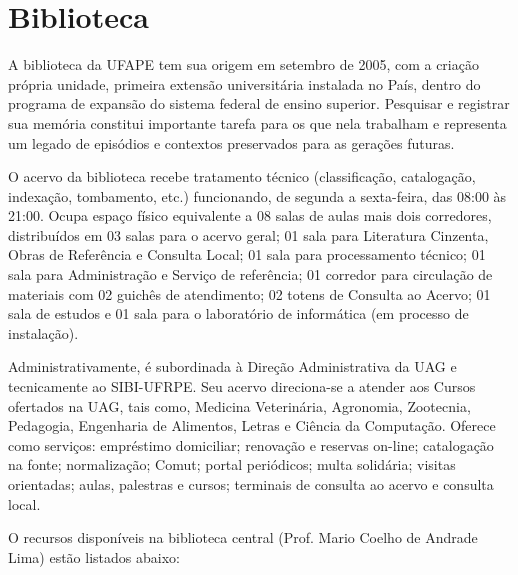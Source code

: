 \documentclass[
	12pt,				%
	openright,			%
  oneside,     %
	a4paper,			%
 hyphens,
	chapter=TITLE,		%
	english,			%
	french,				%
	spanish,			%
	brazil				%
	]{abntex2}
\begin{document}
\section{Biblioteca}

A biblioteca da UFAPE tem sua origem em setembro de 2005, com a criação própria unidade, primeira extensão universitária instalada no País, dentro do programa de expansão do sistema federal de ensino superior. Pesquisar e registrar sua memória constitui importante tarefa para os que nela trabalham e representa um legado de episódios e contextos preservados para as gerações futuras.

O acervo da biblioteca recebe tratamento técnico (classificação, catalogação, indexação, tombamento, etc.) funcionando, de segunda a sexta-feira, das 08:00 às 21:00. Ocupa espaço físico equivalente a 08 salas de aulas mais dois corredores, distribuídos em 03 salas para o acervo geral; 01 sala para Literatura Cinzenta, Obras de Referência e Consulta Local; 01 sala para processamento técnico; 01 sala para Administração e Serviço de referência; 01 corredor para circulação de materiais com 02 guichês de atendimento; 02 totens de Consulta ao Acervo; 01 sala de estudos e 01 sala para o laboratório de informática (em processo de instalação).

Administrativamente, é subordinada à Direção Administrativa da UAG e tecnicamente ao SIBI-UFRPE. Seu acervo direciona-se a atender aos Cursos ofertados na UAG, tais como, Medicina Veterinária, Agronomia, Zootecnia, Pedagogia, Engenharia de Alimentos, Letras e Ciência da Computação. Oferece como serviços: empréstimo domiciliar; renovação e reservas on-line; catalogação na fonte; normalização; Comut; portal periódicos; multa solidária; visitas orientadas; aulas, palestras e cursos; terminais de consulta ao acervo e consulta local. 

O recursos disponíveis na biblioteca central (Prof. Mario Coelho de Andrade Lima) estão listados abaixo:
\end{document}
